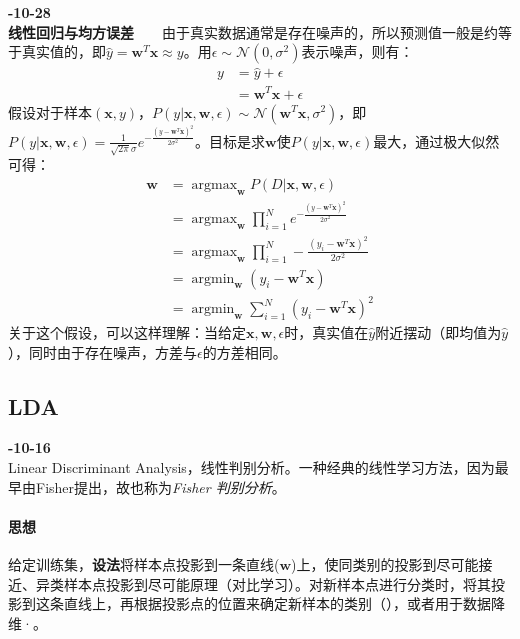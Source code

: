 \textbf{-10-28}\\
\textbf{线性回归与均方误差}\ \ \ \
由于真实数据通常是存在噪声的，所以预测值一般是约等于真实值的，即$\hat{y} = \boldsymbol{w}^T \boldsymbol{x} \approx y$。用$\epsilon \sim \mathcal{N}(0, \sigma^2)$表示噪声，则有：
\begin{align}
	y &= \hat{y} + \epsilon \nonumber \\
	  &= \boldsymbol{w}^T \boldsymbol{x} + \epsilon 	\nonumber
\end{align}
假设对于样本$(\boldsymbol{x}, y)$，$P(y | \boldsymbol{x}, \boldsymbol{w}, \epsilon) \sim \mathcal{N}(\boldsymbol{w}^T \boldsymbol{x}, \sigma^2)$，即$P(y | \boldsymbol{x}, \boldsymbol{w}, \epsilon) = \frac{1}{\sqrt{2\pi} \sigma} e^{-\frac{(y - \boldsymbol{w}^T \boldsymbol{x})^2}{2 \sigma^2}}$。目标是求$\boldsymbol{w}$使$P(y | \boldsymbol{x}, \boldsymbol{w}, \epsilon)$最大，通过极大似然可得：
\begin{align}
	\boldsymbol{w} &= \mathop{argmax}_{\boldsymbol{w}} P(D | \boldsymbol{x}, \boldsymbol{w}, \epsilon) \nonumber \\
		&= \mathop{argmax}_{\boldsymbol{w}} \prod_{i=1}^N e^{-\frac{(y - \boldsymbol{w}^T \boldsymbol{x})^2}{2 \sigma^2}} \nonumber \nonumber \\
		&= \mathop{argmax}_{\boldsymbol{w}} \prod_{i=1}^N -\frac{(y_i - \boldsymbol{w}^T \boldsymbol{x})^2}{2 \sigma^2} \nonumber \\
		&= \mathop{argmin}_{\boldsymbol{w}} (y_i - \boldsymbol{w}^T \boldsymbol{x}) \nonumber \\
		&= \mathop{argmin}_{\boldsymbol{w}} \sum_{i=1}^N (y_i - \boldsymbol{w}^T \boldsymbol{x})^2  \nonumber
\end{align}
关于这个假设，可以这样理解：当给定$\boldsymbol{x}, \boldsymbol{w}, \epsilon$时，真实值在$\hat{y}$附近摆动（即均值为$\hat{y}$），同时由于存在噪声，方差与$\epsilon$的方差相同。

\subsection{LDA}
\textbf{-10-16}\\
Linear Discriminant Analysis，线性判别分析。一种经典的线性学习方法，因为最早由Fisher提出，故也称为\textit{Fisher 判别分析}。

\paragraph{思想}给定训练集，\textbf{设法}将样本点投影到一条直线($\boldsymbol{w}$)上，使同类别的投影到尽可能接近、异类样本点投影到尽可能原理（对比学习）。对新样本点进行分类时，将其投影到这条直线上，再根据投影点的位置来确定新样本的类别（），或者用于数据降维·。

